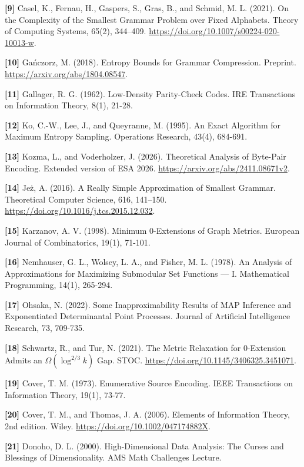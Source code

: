 \documentclass[
]{article}
\begin{document}
\textbf{{[}9{]}} Casel, K., Fernau, H., Gaspers, S., Gras, B.,
and Schmid, M. L. (2021). On the Complexity of the Smallest Grammar Problem
over Fixed Alphabets. Theory of Computing Systems, 65(2), 344--409.
\url{https://doi.org/10.1007/s00224-020-10013-w}.

\textbf{{[}10{]}} Ga\'nczorz, M. (2018).
Entropy Bounds for Grammar Compression. Preprint.
\url{https://arxiv.org/abs/1804.08547}.

\textbf{{[}11{]}} Gallager, R. G. (1962). Low-Density Parity-Check Codes. IRE
Transactions on Information Theory, 8(1), 21-28.

\textbf{{[}12{]}} Ko, C.-W., Lee, J., and Queyranne, M. (1995). An Exact Algorithm for
Maximum Entropy Sampling. Operations Research, 43(4), 684-691.

\textbf{{[}13{]}} Kozma, L., and Voderholzer, J. (2026).
Theoretical Analysis of Byte-Pair Encoding. Extended version of ESA 2026.
\url{https://arxiv.org/abs/2411.08671v2}.

\textbf{{[}14{]}} Je\.z, A. (2016). A Really Simple Approximation of
Smallest Grammar. Theoretical Computer Science, 616, 141--150.
\url{https://doi.org/10.1016/j.tcs.2015.12.032}.

\textbf{{[}15{]}} Karzanov, A. V. (1998). Minimum 0-Extensions of Graph
Metrics. European Journal of Combinatorics, 19(1), 71-101.

\textbf{{[}16{]}} Nemhauser, G. L., Wolsey, L. A., and Fisher, M. L. (1978). An Analysis
of Approximations for Maximizing Submodular Set Functions --- I.
Mathematical Programming, 14(1), 265-294.

\textbf{{[}17{]}} Ohsaka, N. (2022). Some Inapproximability Results of MAP Inference
and Exponentiated Determinantal Point Processes. Journal of Artificial
Intelligence Research, 73, 709-735.

\textbf{{[}18{]}} Schwartz, R., and Tur, N. (2021). The
Metric Relaxation for $0$-Extension Admits an $\Omega(\log^{2/3} k)$ Gap.
STOC. \url{https://doi.org/10.1145/3406325.3451071}.

\textbf{{[}19{]}} Cover, T. M. (1973). Enumerative Source Encoding. IEEE
Transactions on Information Theory, 19(1), 73-77.

\textbf{{[}20{]}} Cover, T. M., and
Thomas, J. A. (2006). Elements of Information Theory, 2nd edition. Wiley.
\url{https://doi.org/10.1002/047174882X}.

\textbf{{[}21{]}} Donoho, D. L. (2000). High-Dimensional Data Analysis:
The Curses and Blessings of Dimensionality. AMS Math Challenges Lecture.
\end{document}
